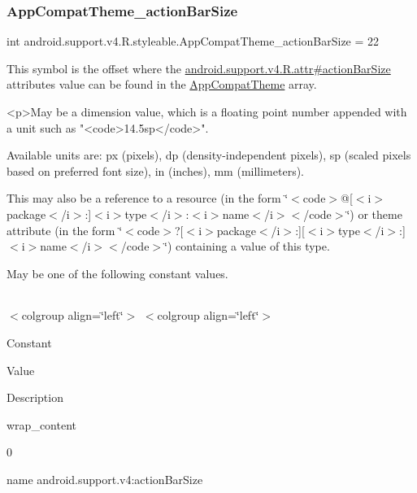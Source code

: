 \subsubsection{\texorpdfstring{App\+Compat\+Theme\+\_\+action\+Bar\+Size}{AppCompatTheme\_actionBarSize}}
{\footnotesize\ttfamily int android.\+support.\+v4.\+R.\+styleable.\+App\+Compat\+Theme\+\_\+action\+Bar\+Size = 22\hspace{0.3cm}{\ttfamily [static]}}

This symbol is the offset where the \hyperlink{classandroid_1_1support_1_1v4_1_1R_1_1attr_a1d83594440797e711b748e5b66c2852d}{android.\+support.\+v4.\+R.\+attr\#action\+Bar\+Size} attribute\textquotesingle{}s value can be found in the \hyperlink{classandroid_1_1support_1_1v4_1_1R_1_1styleable_ac07ebbe62ed977f6dcaadc6397840ace}{App\+Compat\+Theme} array.

\begin{DoxyVerb}      <p>May be a dimension value, which is a floating point number appended with a unit such as "<code>14.5sp</code>".
\end{DoxyVerb}
 Available units are\+: px (pixels), dp (density-\/independent pixels), sp (scaled pixels based on preferred font size), in (inches), mm (millimeters). 

This may also be a reference to a resource (in the form \char`\"{}$<$code$>$@\mbox{[}$<$i$>$package$<$/i$>$\+:\mbox{]}$<$i$>$type$<$/i$>$\+:$<$i$>$name$<$/i$>$$<$/code$>$\char`\"{}) or theme attribute (in the form \char`\"{}$<$code$>$?\mbox{[}$<$i$>$package$<$/i$>$\+:\mbox{]}\mbox{[}$<$i$>$type$<$/i$>$\+:\mbox{]}$<$i$>$name$<$/i$>$$<$/code$>$\char`\"{}) containing a value of this type. 

May be one of the following constant values.

\tabulinesep=1mm
\begin{longtabu} spread 0pt [c]{*{0}{|X[-1]}|}
\hline
\end{longtabu}
$<$colgroup align=\char`\"{}left\char`\"{}$>$ $<$colgroup align=\char`\"{}left\char`\"{}$>$ 

Constant

Value

Description 

{\ttfamily wrap\+\_\+content}

0

name android.\+support.\+v4\+:action\+Bar\+Size \mbox{\label{classandroid_1_1support_1_1v4_1_1R_1_1styleable_ab3556694f1ba3adfd224a083e4c5b5b2}} 
